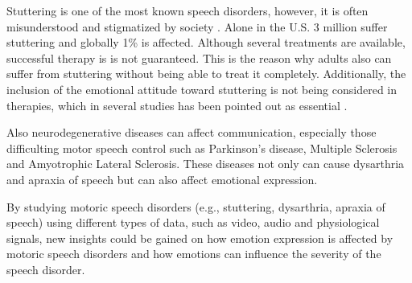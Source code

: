 Stuttering is one of the most known speech disorders, however, it is often misunderstood and stigmatized by society \cite{Boyle2016}. Alone in the U.S. 3 million suffer stuttering and globally 1\% is affected. Although several treatments are available, successful therapy is is not guaranteed. This is the reason why adults also can suffer from stuttering without being able to treat it completely. Additionally, the inclusion of the emotional attitude toward stuttering is not being considered in therapies, which in several studies has been pointed out as essential \cite{Vanryckeghem2001,Smith2017,Choi2016}.

Also neurodegenerative diseases can affect communication, especially those difficulting motor speech control such as Parkinson's disease, Multiple Sclerosis and Amyotrophic Lateral Sclerosis. These diseases not only can cause dysarthria and apraxia of speech but can also affect emotional expression.


By studying motoric speech disorders (e.g., stuttering, dysarthria, apraxia of speech) using different types of data, such as video, audio and physiological signals, new insights could be gained on how emotion expression is affected by motoric speech disorders and how emotions can influence the severity of the speech disorder. 



